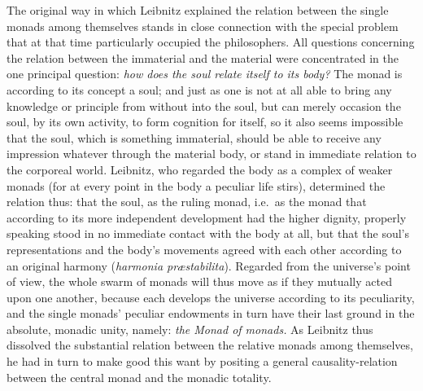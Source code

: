 \documentclass[12pt]{book}
\begin{document}
The original way in which Leibnitz explained the relation between the single
monads among themselves stands in close connection with the special problem
that at that time particularly occupied the philosophers. All questions
concerning the relation between the immaterial and the material were
concentrated in the one principal question: \emph{how does the soul relate
itself to its body?} The monad is according to its concept a soul; and just
as one is not at all able to bring any knowledge or principle from without
into the soul, but can merely occasion the soul, by its own activity, to
form cognition for itself, so it also seems impossible that the soul, which
is something immaterial, should be able to receive any impression whatever
through the material body, or stand in immediate relation to the corporeal
world. Leibnitz, who regarded the body as a complex of weaker monads (for at
every point in the body a peculiar life stirs), determined the relation
thus: that the soul, as the ruling monad, i.e.\ as the monad that according
to its more independent development had the higher dignity, properly
speaking stood in no immediate contact with the body at all, but that the
soul's representations and the body's movements agreed with each other
according to an original harmony (\textit{harmonia præstabilita}). Regarded
from the universe's point of view, the whole swarm of monads will thus move
as if they mutually acted upon one another, because each develops the
universe according to its peculiarity, and the single monads' peculiar
endowments in turn have their last ground in the absolute, monadic unity,
namely: \emph{the Monad of monads.} As Leibnitz thus dissolved the
substantial relation between the relative monads among themselves, he had in
turn to make good this want by positing a general causality-relation between
the central monad and the monadic totality.
\end{document}
